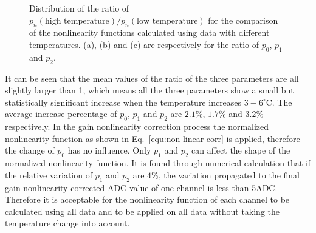 \documentclass[preprint,sort&compress,12pt]{elsarticle}
\begin{document}
\begin{figure}[!ht]
\centering
{}
\caption{Distribution of the ratio of $p_n(\text{high temperature}) / p_n(\text{low temperature})$ for the comparison of the nonlinearity functions calculated using data with different temperatures. (a), (b) and (c) are respectively for the ratio of $p_0$, $p_1$ and $p_2$.}\label{fig:nonlin_temp}
\end{figure}

It can be seen that the mean values of the ratio of the three parameters are all slightly larger than 1, which means all the three parameters show a small but statistically significant increase when the temperature increases $3-6^\circ\mathrm{C}$. The average increase percentage of $p_0$, $p_1$ and $p_2$ are $2.1\%$, $1.7\%$ and $3.2\%$ respectively. In the gain nonlinearity correction process the normalized nonlinearity function as shown in Eq.~\eqref{equ:non-linear-corr} is applied, therefore the change of $p_0$ has no influence. Only $p_1$ and $p_2$ can affect the shape of the normalized nonlinearity function. It is found through numerical calculation that if the relative variation of $p_1$ and $p_2$ are $4\%$, the variation propagated to the final gain nonlinearity corrected ADC value of one channel is less than 5\;ADC. Therefore it is acceptable for the nonlinearity function of each channel to be calculated using all data and to be applied on all data without taking the temperature change into account.
\end{document}
